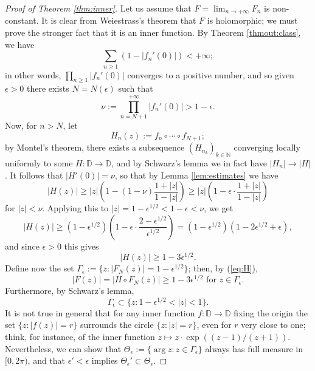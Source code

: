 \documentclass[10pt,a4paper]{amsart}
\def\D{\mathbb{D}}
\begin{document}
\begin{proof}[Proof of Theorem \ref{thm:inner}]
Let us assume that $F = \lim_{n\to +\infty} F_n$ is non-constant. It is clear from Weiestrass's theorem that $F$ is holomorphic; we must prove the stronger fact that it is an inner function. By Theorem \ref{thmout:class}, we have
\[ \sum_{n\geq 1} (1 - |f_n'(0)|) < +\infty; \]
in other words, $\prod_{n\geq 1} |f_n'(0)|$ converges to a positive number, and so given $\epsilon > 0$ there exists $N = N(\epsilon)$ such that
\[ \nu := \prod_{n=N+1}^{+\infty} |f_n'(0)| > 1 - \epsilon. \]
Now, for $n > N$, let
\[ H_n(z) := f_n\circ\cdots\circ f_{N+1}; \]
by Montel's theorem, there exists a subsequence $(H_{n_k})_{k\in\mathbb{N}}$ converging locally uniformly to some $H:\D\to\D$, and by Schwarz's lemma we in fact have $|H_n|\to |H|$. It follows that $|H'(0)| = \nu$, so that by Lemma \ref{lem:estimates} we have
\[ |H(z)| \geq |z|\left(1 - (1 - \nu)\frac{1 + |z|}{1 - |z|}\right) \geq |z|\left(1 - \epsilon\cdot\frac{1 + |z|}{1 - |z|}\right) \]
for $|z| < \nu$. Applying this to $|z| = 1 - \epsilon^{1/2} < 1 - \epsilon < \nu$, we get
\[ |H(z)| \geq (1 - \epsilon^{1/2})\left(1 - \epsilon\cdot\frac{2 - \epsilon^{1/2}}{\epsilon^{1/2}}\right) = (1 - \epsilon^{1/2})(1 - 2\epsilon^{1/2} + \epsilon), \]
and since $\epsilon > 0$ this gives
\begin{equation} \label{eq:H}
    |H(z)| \geq 1 - 3\epsilon^{1/2}.
\end{equation}
Define now the set $\Gamma_\epsilon := \{z : |F_N(z)| = 1 - \epsilon^{1/2}\}$; then, by (\ref{eq:H}),
\begin{equation} \label{eq:HGN}
    \text{$|F(z)| = |H\circ F_N(z)| \geq 1 - 3\epsilon^{1/2}$ for $z\in \Gamma_\epsilon$.}
\end{equation}
Furthermore, by Schwarz's lemma,
\begin{equation} \label{eq:Ge}
    \Gamma_\epsilon \subset \{z : 1 - \epsilon^{1/2} < |z| < 1\}.
\end{equation}
It is not true in general that for any inner function $f:\D\to\D$ fixing the origin the set $\{z : |f(z)| = r\}$ surrounds the circle $\{z : |z| = r\}$, even for $r$ very close to one; think, for instance, of the inner function $z\mapsto z\cdot\exp\left((z - 1)/(z + 1)\right)$. Nevertheless, we can show that $\Theta_\epsilon := \{\arg z : z\in\Gamma_\epsilon\}$ always has full measure in $[0, 2\pi)$, and that $\epsilon' < \epsilon$ implies $\Theta_\epsilon'\subset \Theta_\epsilon$.


\end{proof}
\end{document}
